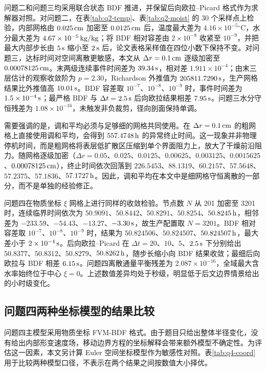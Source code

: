 \documentclass[UTF8,a4paper,12pt]{ctexart}
\numberwithin{equation}{section}
\begin{document}
问题二和问题三均采用联合状态 BDF 推进，并保留后向欧拉--Picard 格式作为求解器对照。对问题二，在表\ref{tab:q2-temp}、表\ref{tab:q2-moist} 的 30 个采样点上检验，内部网格由 $0.025\rm\,cm$ 加密至 $0.0125\rm\,cm$ 后，温度最大差为 $4.16\times10^{-5}{}^\circ\mathrm C$，水分最大差为 $4.67\times10^{-5}\rm\,kg/kg$；将 BDF 相对容差由 $2\times10^{-8}$ 收紧至 $10^{-9}$，并把最大内部步长由 $5\rm\,s$ 缩小至 $2\rm\,s$ 后，论文表格采样值在四位小数下保持不变。对问题三，达标时间对空间离散更敏感，本文从 $\Delta r=0.1\rm\,cm$ 逐级加密至 $0.00078125\rm\,cm$。末两级连续事件时间差为 $39.34\rm\,s$，相对差 $1.911\times10^{-4}$；由末三层估计的观察收敛阶为 $p=2.30$，Richardson 外推值为 $205811.7290\rm\,s$，生产网格结果比外推值高 $10.01\rm\,s$。BDF 容差取 $10^{-7}$、$10^{-8}$、$10^{-9}$ 时，事件时间差为 $1.5\times10^{-4}\rm\,s$；最严格 BDF 与 $\Delta t=2.5\rm\,s$ 后向欧拉结果相差 $7.95\rm\,s$。问题三水分守恒残差为 $1.08\times10^{-16}$，未触发非负裁剪，径向剖面保持单调。

需要强调的是，调和平均必须与足够细的网格共同使用。在 $\Delta r=0.1\rm\,cm$ 的粗网格上直接使用调和平均，会得到 $557.4748\rm\,h$ 的异常终止时间。这一现象并非物理停机时间，而是粗网格将表层低扩散区压缩到单个界面阻力上，放大了干燥前沿阻力。随网格逐级加密（$\Delta r=0.05$、$0.025$、$0.0125$、$0.00625$、$0.003125$、$0.0015625$、$0.00078125\rm\,cm$），终止时间依次回落到 $226.5453$、$88.1319$、$60.2157$、$57.5648$、$57.2375$、$57.1836$、$57.1727\rm\,h$。因此，调和平均在本文中是细网格守恒离散的一部分，而不是单独的经验修正。

问题四在物质坐标 $\xi$ 网格上进行同样的收敛检验。节点数 $N$ 从 201 加密至 3201 时，连续临界时间依次为 $50.9091$、$50.8442$、$50.8291$、$50.8254$、$50.8245\rm\,h$，相邻差为 $-233.59$、$-54.43$、$-13.27$、$-3.30\rm\,s$，故生产配置取 $N=3201$。BDF 相对容差取 $10^{-7}$、$10^{-8}$、$10^{-9}$ 时，结果为 $50.824506$、$50.824507$、$50.824507\rm\,h$，最大差小于 $2\times10^{-4}\rm\,s$。后向欧拉--Picard 在 $\Delta t=20$、$10$、$5$、$2.5\rm\,s$ 下分别给出 $50.8377$、$50.8312$、$50.8279$、$50.8262\rm\,h$，随步长缩小向 BDF 结果收敛；最细后向欧拉与 BDF 相差 $6.15\rm\,s$。问题四离散通量平衡残差为 $2.087\times10^{-16}$，全域最大含水率始终位于中心 $\xi=0$。上述数值差异均处于秒级，明显低于后文边界情景给出的小时级变化。

\subsection{问题四两种坐标模型的结果比较}
问题四主模型采用物质坐标 FVM-BDF 格式。由于题目只给出整体半径变化，没有给出内部形变速度场，移动边界方程的坐标解释会带来额外模型不确定性。为评估这一因素，本文另计算 Euler 空间坐标模型作为敏感性对照。表\ref{tab:q4-coord}用于比较两种模型口径，不表示在两个结果之间按数值大小择优。
\end{document}
